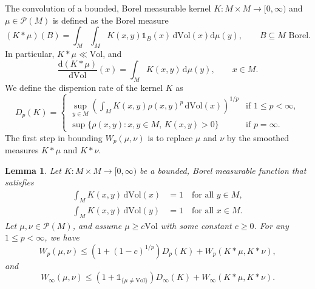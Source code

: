 \documentclass[11pt,a4paper]{article}
\newtheorem{lem}[thm]{Lemma}
\theoremstyle{definition}
\begin{document}
The convolution of a bounded, Borel measurable kernel $K: M \times M \to [0,\infty)$ and $\mu \in \mathcal{P}(M)$ is defined as the Borel measure
\[ (K*\mu)(B) = \int_M \int_M K(x,y) \mathds{1}_B (x) \, \mathrm{d} \mathrm{Vol}(x) \mathrm{d} \mu (y), \qquad B \subseteq M \textrm{ Borel}. \]
In particular, $K*\mu \ll \mathrm{Vol}$, and
\[ \frac{\mathrm{d}(K*\mu)}{\mathrm{d}\mathrm{Vol}} (x) = \int_M K(x,y) \, \mathrm{d}\mu(y), \qquad x \in M. \]
We define the dispersion rate of the kernel $K$ as
\begin{equation}\label{dispersion}
D_p (K) = \left\{ \begin{array}{ll} \displaystyle{\sup_{y \in M} \left( \int_M K(x,y) \rho(x,y)^p \, \mathrm{d}\mathrm{Vol}(x) \right)^{1/p}} & \textrm{if } 1 \le p < \infty, \\ \displaystyle{\sup \{ \rho (x,y) : x,y \in M, \, K(x,y)>0 \}} & \textrm{if } p=\infty . \end{array} \right.
\end{equation}
The first step in bounding $W_p (\mu, \nu)$ is to replace $\mu$ and $\nu$ by the smoothed measures $K*\mu$ and $K*\nu$.
\begin{lem}\label{smoothinglemma} Let $K: M \times M \to [0,\infty)$ be a bounded, Borel measurable function that satisfies
\[ \begin{split} \int_M K(x,y) \, \mathrm{d}\mathrm{Vol}(x) &= 1 \quad \textrm{for all } y \in M, \\ \int_M K(x,y) \, \mathrm{d}\mathrm{Vol}(y) &= 1 \quad \textrm{for all } x \in M . \end{split} \]
Let $\mu, \nu \in \mathcal{P}(M)$, and assume $\mu \ge c \mathrm{Vol}$ with some constant $c \ge 0$. For any $1 \le p < \infty$, we have
\[ W_p (\mu, \nu) \le (1+(1-c)^{1/p}) D_p (K) + W_p (K*\mu, K*\nu) , \]
and
\[ W_{\infty} (\mu, \nu) \le (1+\mathds{1}_{\{ \mu \neq \mathrm{Vol} \}}) D_{\infty} (K) + W_{\infty} (K*\mu, K*\nu) . \]
\end{lem}
\end{document}
